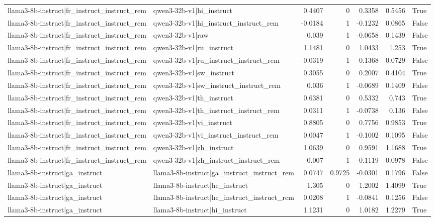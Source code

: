 \begin{table}
\begin{tabular}{l l r r r r l}
llama3-8b-instruct|fr_instruct_instruct_rem & qwen3-32b-v1|hi_instruct & 0.4407 & 0 & 0.3358 & 0.5456 & True \\
llama3-8b-instruct|fr_instruct_instruct_rem & qwen3-32b-v1|hi_instruct_instruct_rem & -0.0184 & 1 & -0.1232 & 0.0865 & False \\
llama3-8b-instruct|fr_instruct_instruct_rem & qwen3-32b-v1|raw & 0.039 & 1 & -0.0658 & 0.1439 & False \\
llama3-8b-instruct|fr_instruct_instruct_rem & qwen3-32b-v1|ru_instruct & 1.1481 & 0 & 1.0433 & 1.253 & True \\
llama3-8b-instruct|fr_instruct_instruct_rem & qwen3-32b-v1|ru_instruct_instruct_rem & -0.0319 & 1 & -0.1368 & 0.0729 & False \\
llama3-8b-instruct|fr_instruct_instruct_rem & qwen3-32b-v1|sw_instruct & 0.3055 & 0 & 0.2007 & 0.4104 & True \\
llama3-8b-instruct|fr_instruct_instruct_rem & qwen3-32b-v1|sw_instruct_instruct_rem & 0.036 & 1 & -0.0689 & 0.1409 & False \\
llama3-8b-instruct|fr_instruct_instruct_rem & qwen3-32b-v1|th_instruct & 0.6381 & 0 & 0.5332 & 0.743 & True \\
llama3-8b-instruct|fr_instruct_instruct_rem & qwen3-32b-v1|th_instruct_instruct_rem & 0.0311 & 1 & -0.0738 & 0.136 & False \\
llama3-8b-instruct|fr_instruct_instruct_rem & qwen3-32b-v1|vi_instruct & 0.8805 & 0 & 0.7756 & 0.9853 & True \\
llama3-8b-instruct|fr_instruct_instruct_rem & qwen3-32b-v1|vi_instruct_instruct_rem & 0.0047 & 1 & -0.1002 & 0.1095 & False \\
llama3-8b-instruct|fr_instruct_instruct_rem & qwen3-32b-v1|zh_instruct & 1.0639 & 0 & 0.9591 & 1.1688 & True \\
llama3-8b-instruct|fr_instruct_instruct_rem & qwen3-32b-v1|zh_instruct_instruct_rem & -0.007 & 1 & -0.1119 & 0.0978 & False \\
llama3-8b-instruct|ga_instruct & llama3-8b-instruct|ga_instruct_instruct_rem & 0.0747 & 0.9725 & -0.0301 & 0.1796 & False \\
llama3-8b-instruct|ga_instruct & llama3-8b-instruct|he_instruct & 1.305 & 0 & 1.2002 & 1.4099 & True \\
llama3-8b-instruct|ga_instruct & llama3-8b-instruct|he_instruct_instruct_rem & 0.0208 & 1 & -0.0841 & 0.1256 & False \\
llama3-8b-instruct|ga_instruct & llama3-8b-instruct|hi_instruct & 1.1231 & 0 & 1.0182 & 1.2279 & True \\

\end{tabular}
\end{table}
